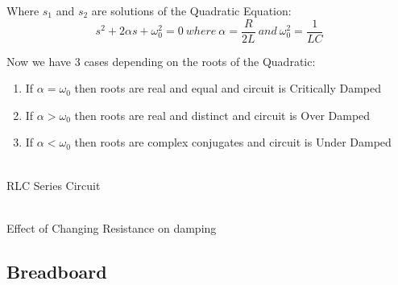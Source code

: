 \documentclass{article}
\begin{document}
\noindent
Where $s_1$ and $s_2$ are solutions of the Quadratic Equation:
\[ s^2+ 2\alpha s + \omega_0^2=0 \ where \ \alpha=\frac{R}{2L} \ and \ \omega_0^2=\frac{1}{LC} \] 

\noindent
Now we have 3 cases depending on the roots of the Quadratic:
\begin{enumerate}
    \item If $\alpha=\omega_0$ then roots are real and equal and circuit is Critically Damped
    \item If $\alpha>\omega_0$ then roots are real and distinct and circuit is Over Damped
    \item If $\alpha<\omega_0$ then roots are complex conjugates and circuit is Under Damped
\end{enumerate}

\begin{multicols}{2}
\begin{center}
 \\ \vspace{5px}
RLC Series Circuit \\

\columnbreak

 \\ \vspace{5px}
Effect of Changing Resistance on damping
\end{center}
\end{multicols}

\newpage

\subsection{Breadboard}
\vspace{10px}
\begin{center}
\end{center}
\end{document}
